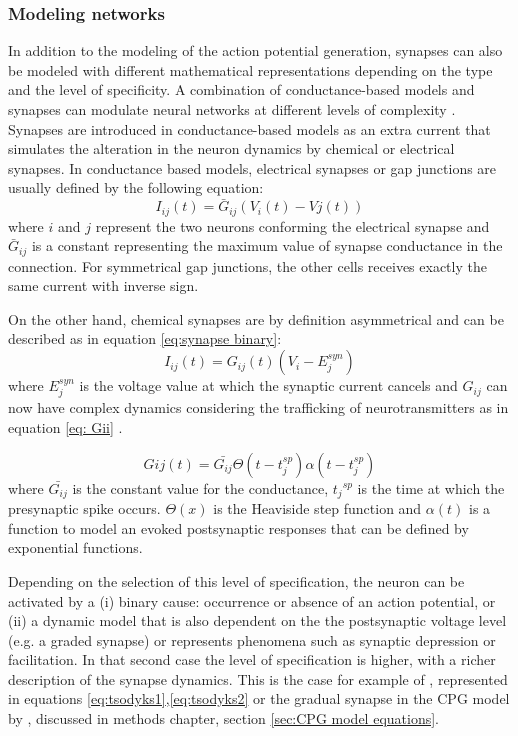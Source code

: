 \subsubsection{\large{Modeling networks}}
\label{c-intro-synapses}
In addition to the modeling of the action potential generation, synapses can also be modeled with different mathematical representations depending on the type and the level of specificity. A combination of conductance-based models and synapses can modulate neural networks at different levels of complexity \parencite{aguirre_pattern_2007,latorre_transient_2013,huerta_topology_2001}. Synapses are introduced in conductance-based models as an extra current that simulates the alteration in the neuron dynamics by chemical or electrical synapses. In conductance based models, electrical synapses or gap junctions are usually defined by the following equation:
\begin{equation}
    I_{ij}(t) = \bar{G}_{ij} (V_i(t) - Vj(t))
\end{equation}
\noindent where $i$ and $j$ represent the two neurons conforming the electrical synapse and $\bar{G}_{ij}$ is a constant representing the maximum value of synapse conductance in the connection. For symmetrical gap junctions, the other cells receives exactly the same current with inverse sign.

On the other hand, chemical synapses are by definition asymmetrical and can be described as in equation \ref{eq:synapse binary}:
\begin{equation}
     I_{ij}(t) = G_{ij}(t) (V_i - E_j^{syn})
     \label{eq:synapse binary}
\end{equation}
\noindent where $E_j^{syn}$ is the voltage value at which the synaptic current cancels and $G_{ij}$ can now have complex dynamics considering the trafficking of neurotransmitters as in equation \ref{eq: Gii} \parencite{torres_modeling_2012}. 

\begin{equation}
	G{ij}(t) = \bar{G_{ij}}  \Theta(t-t_j^{sp}) \alpha (t-t_j^{sp})
	\label{eq: Gii}
\end{equation}
\noindent where $\bar{G_{ij}}$ is the constant value for the conductance, ${t_j}^{sp}$ is the time at which the presynaptic spike occurs. $\Theta(x)$ is the Heaviside step function and $\alpha(t)$ is a function to model an evoked postsynaptic responses that can be defined by exponential functions.

Depending on the selection of this level of specification, the neuron can be activated by a (i) binary cause: occurrence or absence of an action potential, or (ii) a dynamic model that is also dependent on the the postsynaptic voltage level (e.g. a graded synapse) or represents phenomena such as synaptic depression or facilitation. In that second case the level of specification is higher, with a richer description of the synapse dynamics. This is the case for example of \cite{tsodyks_neural_1997}, represented in equations \ref{eq:tsodyks1},\ref{eq:tsodyks2} or the gradual synapse in the CPG model by \cite{vavoulis_dynamic_2007}, discussed in methods chapter, section \ref{sec:CPG model equations}.


